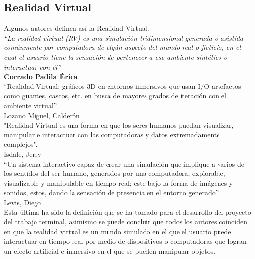 \subsection{Realidad Virtual}
Algunos autores definen así la Realidad Virtual.\\
\newline
\textit{“La realidad virtual (RV) es una simulación tridimensional generada o asistida comúnmente por computadora de algún aspecto del mundo real o ficticio, en el cual el usuario tiene la sensación de pertenecer a ese ambiente sintético o interactuar con él”}\cite{web6}\\ 
\textbf{Corrado Padila Érica}\\
\newline
“Realidad Virtual: gráficos 3D en entornos inmersivos que usan I/O
artefactos como guantes, cascos, etc. en busca de mayores grados de iteración
con el ambiente virtual”\cite{web7}\\ 
Lozano Miguel, Calderón\\
\newline
"Realidad Virtual es una forma en que los seres humanos puedan
visualizar, manipular e interactuar con las computadoras y datos extremadamente
complejos".\cite{web8}\\
Isdale, Jerry\\
\newline
“Un sistema interactivo capaz de crear una simulación que implique a varios de los sentidos del ser humano, generados por una computadora, explorable, visualizable y manipulable en tiempo real; este bajo la forma de imágenes y sonidos, estos, dando la sensación de presencia en el entorno generado”\cite{web9}\\
Levis, Diego\\
\newline
Esta última ha sido la definición que se ha tomado para el desarrollo del proyecto del trabajo terminal, asimismo se puede concluir que todos los autores coinciden en que la realidad virtual es un mundo simulado en el que el usuario puede interactuar en tiempo real por medio
de dispositivos o computadoras que logran un efecto artificial e inmersivo en el que se pueden manipular objetos.\\
\newline

